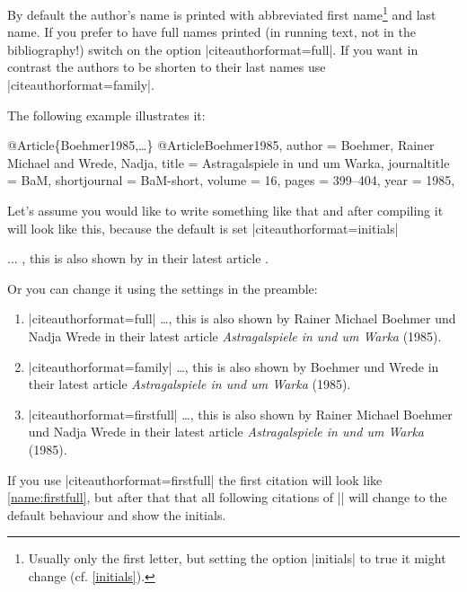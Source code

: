 \documentclass[a4paper,
10pt,
greek,
french,
spanish,
italian,
ngerman,
english
]{ltxdoc}
\begin{document}
By default the author's name is printed with abbreviated first name\footnote{Usually only the first letter, but setting the option |initials| to true it might change (cf. \cref{initials}).} and last name.
If you prefer to have full names printed (in running text, not in the bibliography!) switch on the option |citeauthorformat=full|.
If you want in contrast the authors to be shorten to their last names use |citeauthorformat=family|.

The following example illustrates it:

\begin{bibexample}[label=Boehmer1985]{{@}Article\{Boehmer1985,…\}}
@Article{Boehmer1985,
  author       = {Boehmer, Rainer Michael and Wrede, Nadja},
  title        = {Astragalspiele in und um Warka},
  journaltitle = BaM,
  shortjournal = BaM-short,
  volume       = {16},
  pages        = {399--404},
  year         = {1985},
}
\end{bibexample}

Let's assume you would like to write something like that and
after compiling it will look like this, 
because the default is set  |citeauthorformat=initials| 

\begin{refsection}
\begin{example}
... , this is also shown by \citeauthor{Boehmer1985} 
 in their latest article .
 \end{example}



Or you can change it using the settings in the preamble:

\begin{enumerate}
\item\label{name:full} 
\begin{tcolorbox}[examplebox]
 |citeauthorformat=full| 
 \tcblower
\ldots , this is also shown by {\color{red}Rainer Michael Boehmer  und Nadja Wrede} in their latest article \emph{Astragalspiele in und um Warka} (1985).
\end{tcolorbox}
\item\label{name:family}
\begin{tcolorbox}[examplebox]
 |citeauthorformat=family| 
 \tcblower
\ldots , this is also shown by {\color{red}Boehmer und  Wrede} in their latest article \emph{Astragalspiele in und um Warka} (1985).
\end{tcolorbox}
\item\label{name:firstfull}
\begin{tcolorbox}[examplebox]
 |citeauthorformat=firstfull| 
 \tcblower
\ldots , this is also shown by {\color{red}Rainer Michael Boehmer  und Nadja Wrede} in their latest article \emph{Astragalspiele in und um Warka} (1985).
\end{tcolorbox}
\end{enumerate}


If you use |citeauthorformat=firstfull| the first citation will look like \ref{name:firstfull}, but after that that all following citations of |\citeauthor{Boehmer1985}| will change to the default behaviour and show the initials.
\end{refsection}
\end{document}
